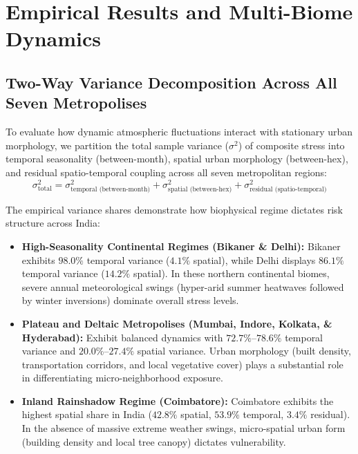 \section{Empirical Results and Multi-Biome Dynamics}
\label{sec:results}

\subsection{Two-Way Variance Decomposition Across All Seven Metropolises}
To evaluate how dynamic atmospheric fluctuations interact with stationary urban morphology, we partition the total sample variance ($\sigma^2$) of composite stress into temporal seasonality (between-month), spatial urban morphology (between-hex), and residual spatio-temporal coupling across all seven metropolitan regions:
\begin{equation}
    \sigma^2_{\text{total}} = \sigma^2_{\text{temporal (between-month)}} + \sigma^2_{\text{spatial (between-hex)}} + \sigma^2_{\text{residual (spatio-temporal)}}
\end{equation}

The empirical variance shares demonstrate how biophysical regime dictates risk structure across India:
\begin{itemize}
    \item \textbf{High-Seasonality Continental Regimes (Bikaner \& Delhi):} Bikaner exhibits $98.0\%$ temporal variance ($4.1\%$ spatial), while Delhi displays $86.1\%$ temporal variance ($14.2\%$ spatial). In these northern continental biomes, severe annual meteorological swings (hyper-arid summer heatwaves followed by winter inversions) dominate overall stress levels.
    \item \textbf{Plateau and Deltaic Metropolises (Mumbai, Indore, Kolkata, \& Hyderabad):} Exhibit balanced dynamics with $72.7\%\text{--}78.6\%$ temporal variance and $20.0\%\text{--}27.4\%$ spatial variance. Urban morphology (built density, transportation corridors, and local vegetative cover) plays a substantial role in differentiating micro-neighborhood exposure.
    \item \textbf{Inland Rainshadow Regime (Coimbatore):} Coimbatore exhibits the highest spatial share in India ($42.8\%$ spatial, $53.9\%$ temporal, $3.4\%$ residual). In the absence of massive extreme weather swings, micro-spatial urban form (building density and local tree canopy) dictates vulnerability.
\end{itemize}

